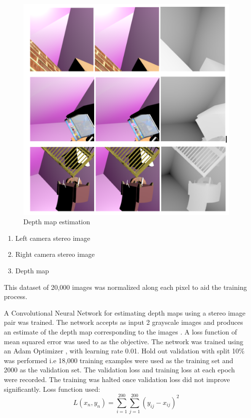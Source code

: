 \begin{figure}[!htb]
  \includegraphics[width=\linewidth]{images/depthmap1.png}
  \caption{Depth map estimation}
  \label{fig:boat1}
\end{figure}

\begin{enumerate}
\item Left camera stereo image
\item Right camera stereo image
\item Depth map
\end{enumerate}
This dataset of 20,000 images was normalized along each pixel to aid the training process.

A Convolutional Neural Network for estimating depth maps using a stereo image pair was trained. The network accepts as input 2 grayscale images and produces an estimate of the depth map corresponding to the images \cite{MayerIHFCDB15} \cite{foucard_2016}.
A loss function of mean squared error was used to as the objective. The network was trained using an Adam Optimizer \cite{KingmaB14}, with learning rate 0.01. Hold out validation with split 10\%  was performed i.e 18,000 training examples were used as the training set and 2000 as the validation set. The validation loss and training loss at each epoch were recorded. The training was halted once validation loss did not improve significantly.
Loss function used:
\[ L(x_n,y_n) = {\sum_{i=1}^{200}\sum_{j=1}^{200}} (y_{ij} - x_{ij})^2 \]